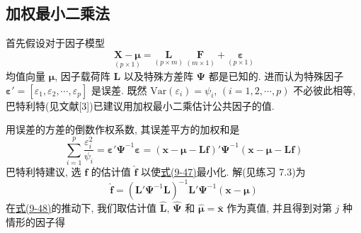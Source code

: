 \subsection*{加权最小二乘法}

首先假设对于因子模型
\[
\underset{(p\times 1)}{\mathbf{X}-\boldsymbol{\mu}}=\underset{(p\times m)}{\mathbf{L}}\ \underset{(m\times 1)}{\mathbf{F}}+\underset{(p\times 1)}{\boldsymbol{\varepsilon}}
\]
均值向量 $\boldsymbol{\mu}$, 因子载荷阵 $\mathbf{L}$ 以及特殊方差阵 $\boldsymbol{\Psi}$ 都是已知的. 进而认为特殊因子 $\boldsymbol{\varepsilon}'=[\varepsilon_1,\varepsilon_2,\cdots,\varepsilon_p]$ 是误差. 既然 $\mathrm{Var}(\varepsilon_i)=\psi_i$, $(i=1,2,\cdots,p)$ 不必彼此相等, 巴特利特(见文献[3])已建议用加权最小二乘估计公共因子的值.

用误差的方差的倒数作权系数, 其误差平方的加权和是
\label{eq:9-47}
\begin{equation}
\sum_{i=1}^{p}\frac{\varepsilon_i^2}{\psi_i}=\boldsymbol{\varepsilon}'\boldsymbol{\Psi}^{-1}\boldsymbol{\varepsilon}=(\mathbf{x}-\boldsymbol{\mu}-\mathbf{L}\mathbf{f})'\boldsymbol{\Psi}^{-1}(\mathbf{x}-\boldsymbol{\mu}-\mathbf{L}\mathbf{f}) \tag{9-47}
\end{equation}
巴特利特建议, 选 $\mathbf{f}$ 的估计值 $\hat{\mathbf{f}}$ 以使\hyperref[eq:9-47]{式(9-47)}最小化. 解(见练习 7.3)为
\label{eq:9-48}
\begin{equation}
\hat{\mathbf{f}}=(\mathbf{L}'\boldsymbol{\Psi}^{-1}\mathbf{L})^{-1}\mathbf{L}'\boldsymbol{\Psi}^{-1}(\mathbf{x}-\boldsymbol{\mu}) \tag{9-48}
\end{equation}
在\hyperref[eq:9-48]{式(9-48)}的推动下, 我们取估计值 $\hat{\mathbf{L}}$, $\hat{\boldsymbol{\Psi}}$ 和 $\hat{\boldsymbol{\mu}}=\bar{\mathbf{x}}$ 作为真值, 并且得到对第 $j$ 种情形的因子得
